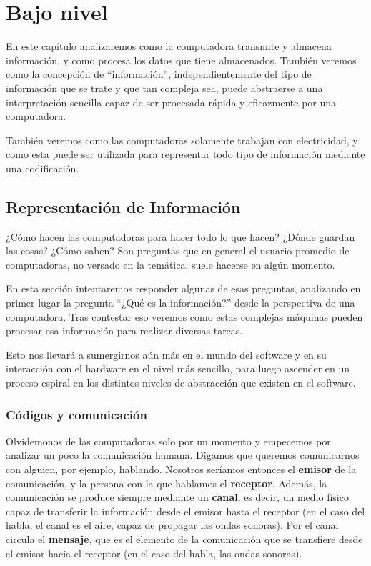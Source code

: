 
\chapter{Bajo nivel}

En este capítulo analizaremos como la computadora transmite y almacena
información, y como procesa los datos que tiene almacenados. También veremos
como la concepción de ``información'', independientemente del tipo de información
que se trate y que tan compleja sea, puede abstraerse a una interpretación
sencilla capaz de ser procesada rápida y eficazmente por una computadora.

También veremos como las computadoras solamente trabajan
con electricidad, y como esta puede ser utilizada para representar todo tipo
de información mediante una codificación.

\section{Representación de Información}

¿Cómo hacen las computadoras para hacer todo lo que hacen? ¿Dónde guardan las
cosas? ¿Cómo saben? Son preguntas que en general el usuario promedio de
computadoras, no versado en la temática, suele hacerse en algún momento.

En esta sección intentaremos responder algunas de esas preguntas, analizando en
primer lugar la pregunta ``¿Qué es la información?'' desde la perspectiva de una
computadora. Tras contestar eso veremos como estas complejas máquinas pueden
procesar esa información para realizar diversas tareas.

Esto nos llevará a sumergirnos aún más en el mundo del software y en su interacción
con el hardware en el nivel más sencillo, para luego ascender en un proceso
espiral en los distintos niveles de abstracción que existen en el software.

\subsection{Códigos y comunicación}

Olvidemonos de las computadoras solo por un momento y empecemos por analizar un
poco la comunicación humana. Digamos que queremos comunicarnos con alguien, por
ejemplo, hablando. Nosotros seríamos entonces el \textbf{emisor} de la comunicación,
y la persona con la que hablamos el \textbf{receptor}. Además, la comunicación se
produce siempre mediante un \textbf{canal}, es decir, un medio físico capaz de
transferir la información desde el emisor hasta el receptor (en el caso del habla,
el canal es el aire, capaz de propagar las ondas sonoras). Por el canal
circula el \textbf{mensaje}, que es el elemento de la comunicación que se transfiere
desde el emisor hacia el receptor (en el caso del habla, las ondas sonoras).

